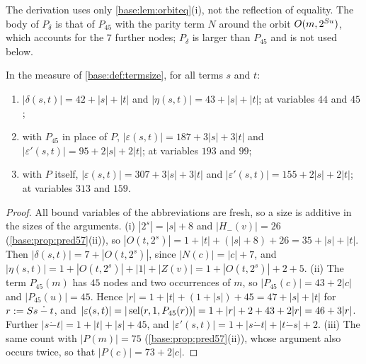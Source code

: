 The derivation uses only \cref{base:lem:orbiteq}(i), not the reflection of
equality.  The body of $P_\delta$ is that of $P_{45}$ with the parity term
$N$ around the orbit $O(m,2^{S u})$, which accounts for the $7$ further
nodes; $P_\delta$ is larger than $P_{45}$ and is not used below.

\begin{proposition}
\label{base:prop:orbitsize}
In the measure of \cref{base:def:termsize}, for all terms $s$ and $t$:
\begin{enumerate}[label=\textup{(\roman*)}]
\item $|\delta(s,t)|=42+|s|+|t|$ and $|\eta(s,t)|=43+|s|+|t|$; at variables
 $44$ and $45$;
\item with $P_{45}$ in place of $P$, $|\varepsilon(s,t)|=187+3|s|+3|t|$ and
 $|\varepsilon'(s,t)|=95+2|s|+2|t|$; at variables $193$ and $99$;
\item with $P$ itself, $|\varepsilon(s,t)|=307+3|s|+3|t|$ and
 $|\varepsilon'(s,t)|=155+2|s|+2|t|$; at variables $313$ and $159$.
\end{enumerate}
\end{proposition}

\begin{proof}
All bound variables of the abbreviations are fresh, so a size is additive in
the sizes of the arguments.  (i) $|2^{s}|=|s|+8$ and $|H_-(v)|=26$
(\cref{base:prop:pred57}(ii)), so
$|O(t,2^{s})|=1+|t|+(|s|+8)+26=35+|s|+|t|$.  Then
$|\delta(s,t)|=7+|O(t,2^{s})|$, since $|N(c)|=|c|+7$, and
$|\eta(s,t)|=1+|O(t,2^{s})|+|1|+|Z(v)|=1+|O(t,2^{s})|+2+5$.
(ii) The term $P_{45}(m)$ has $45$ nodes and two occurrences of $m$, so
$|P_{45}(c)|=43+2|c|$ and $|P_{45}(u)|=45$.  Hence
$|r|=1+|t|+(1+|s|)+45=47+|s|+|t|$ for $r\mathrel{:=}S s\mathbin{\dot-}t$, and
$|\varepsilon(s,t)|=|\operatorname{sel}(r,1,P_{45}(r))|=1+|r|+2+43+2|r|=46+3|r|$.
Further $|s\mathbin{\dot-}t|=1+|t|+|s|+45$, and
$|\varepsilon'(s,t)|=1+|s\mathbin{\dot-}t|+|t\mathbin{\dot-}s|+2$.
(iii) The same count with $|P(m)|=75$ (\cref{base:prop:pred57}(ii)), whose
argument also occurs twice, so that $|P(c)|=73+2|c|$.
\end{proof}

